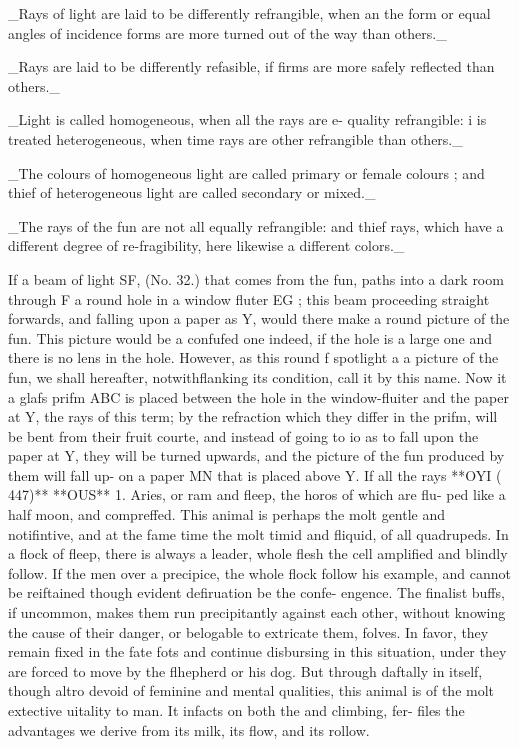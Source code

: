 \documentclass{article}
\begin{document}
\_Rays of light are laid to be differently refrangible, when an the form or equal angles of incidence forms are more turned out of the way than others.\_

\_Rays are laid to be differently refasible, if firms are more safely reflected than others.\_

\_Light is called homogeneous, when all the rays are e- quality refrangible: i is treated heterogeneous, when time rays are other refrangible than others.\_

\_The colours of homogeneous light are called primary or female colours ; and thief of heterogeneous light are called secondary or mixed.\_

\_The rays of the fun are not all equally refrangible: and thief rays, which have a different degree of re-fragibility, here likewise a different colors.\_

If a beam of light SF, (No. 32.) that comes from the fun, paths into a dark room through F a round hole in a window fluter EG ; this beam proceeding straight forwards, and falling upon a paper as Y, would there make a round picture of the fun. This picture would be a confufed one indeed, if the hole is a large one and there is no lens in the hole. However, as this round f spotlight a a picture of the fun, we shall hereafter, notwithflanking its condition, call it by this name. Now it a glafs prifm ABC is placed between the hole in the window-fluiter and the paper at Y, the rays of this term; by the refraction which they differ in the prifm, will be bent from their fruit courte, and instead of going to io as to fall upon the paper at Y, they will be turned upwards, and the picture of the fun produced by them will fall up- on a paper MN that is placed above Y. If all the rays **OYI ( 447)** **OUS** 1. Aries, or ram and fleep, the horos of which are flu- ped like a half moon, and compreffed. This animal is perhaps the molt gentle and notifintive, and at the fame time the molt timid and fliquid, of all quadrupeds. In a flock of fleep, there is always a leader, whole flesh the cell amplified and blindly follow. If the men over a precipice, the whole flock follow his example, and cannot be reiftained though evident defiruation be the confe- engence. The finalist buffs, if uncommon, makes them run precipitantly against each other, without knowing the cause of their danger, or belogable to extricate them, folves. In favor, they remain fixed in the fate fots and continue disbursing in this situation, under they are forced to move by the flhepherd or his dog. But through daftally in itself, though altro devoid of feminine and mental qualities, this animal is of the molt extective uitality to man. It infacts on both the and climbing, fer- files the advantages we derive from its milk, its flow, and its rollow.
\end{document}
